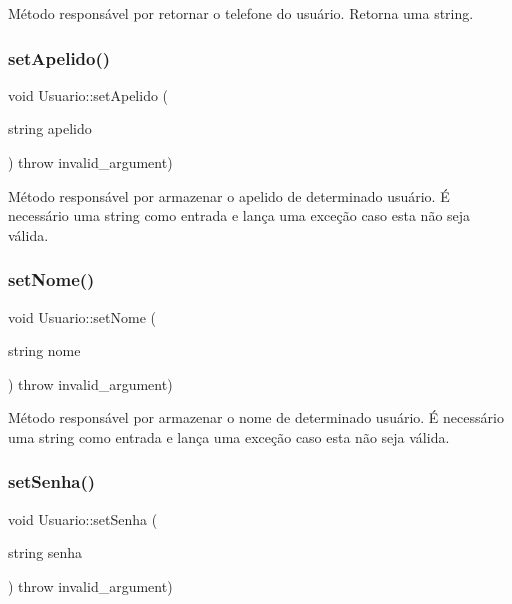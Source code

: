 Método responsável por retornar o telefone do usuário. Retorna uma string. \mbox{\label{classUsuario_ae1c5a1f4d241bfd859ba8d12271265c7}} 
\subsubsection{\texorpdfstring{set\+Apelido()}{setApelido()}}
{\footnotesize\ttfamily void Usuario\+::set\+Apelido (\begin{DoxyParamCaption}\item[{string}]{apelido }\end{DoxyParamCaption}) throw  invalid\+\_\+argument) \hspace{0.3cm}{\ttfamily [inline]}}

Método responsável por armazenar o apelido de determinado usuário. É necessário uma string como entrada e lança uma exceção caso esta não seja válida. \mbox{\label{classUsuario_a7c9b128fcb7b02e6595200ad1cf6f89b}} 
\subsubsection{\texorpdfstring{set\+Nome()}{setNome()}}
{\footnotesize\ttfamily void Usuario\+::set\+Nome (\begin{DoxyParamCaption}\item[{string}]{nome }\end{DoxyParamCaption}) throw  invalid\+\_\+argument) \hspace{0.3cm}{\ttfamily [inline]}}

Método responsável por armazenar o nome de determinado usuário. É necessário uma string como entrada e lança uma exceção caso esta não seja válida. \mbox{\label{classUsuario_ad6ca0fc126212f12a73e7e8536646d60}} 
\subsubsection{\texorpdfstring{set\+Senha()}{setSenha()}}
{\footnotesize\ttfamily void Usuario\+::set\+Senha (\begin{DoxyParamCaption}\item[{string}]{senha }\end{DoxyParamCaption}) throw  invalid\+\_\+argument) \hspace{0.3cm}{\ttfamily [inline]}}

